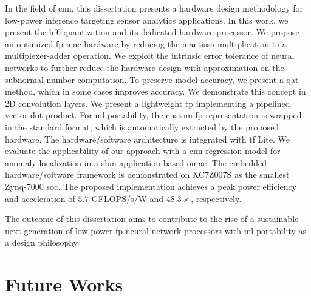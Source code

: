 In the field of \gls{cnn}, this dissertation presents a hardware design methodology for low-power inference targeting sensor analytics applications. In this work, we present the \gls{hf6} quantization and its dedicated hardware processor. We propose an optimized \gls{fp} \gls{mac} hardware by reducing the mantissa multiplication to a multiplexer-adder operation. We exploit the intrinsic error tolerance of neural networks to further reduce the hardware design with approximation on the subnormal number computation. To preserve model accuracy, we present a \gls{qat} method, which in some cases improves accuracy. We demonstrate this concept in 2D convolution layers. We present a lightweight \gls{tp} implementing a pipelined vector dot-product. For \gls{ml} portability, the custom \gls{fp} representation is wrapped in the standard format, which is automatically extracted by the proposed hardware. The hardware/software architecture is integrated with \gls{tf} Lite. We evaluate the applicability of our approach with a \gls{cnn}-regression model for anomaly localization in a \gls{shm} application based on \gls{ae}. The embedded hardware/software framework is demonstrated on XC7Z007S as the smallest Zynq-7000 \gls{soc}. The proposed implementation achieves a peak power efficiency and acceleration of $5.7$ GFLOPS/s/W and $48.3\times$, respectively.

The outcome of this dissertation aims to contribute to the rise of a sustainable next generation of low-power \gls{fp} neural network processors with \gls{ml} portability as a design philosophy.

\section{Future Works}




